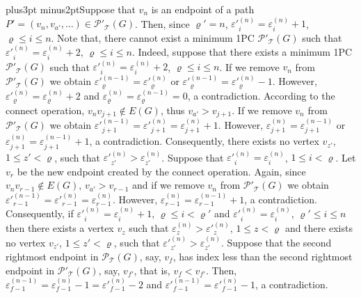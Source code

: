 \documentclass[10pt]{article}
\def\yskip{\penalty-50\vskip3pt plus3pt minus2pt}
\def\y{\yskip}
\begin{document}
{\y Suppose that $v_n$ is an endpoint of a path $P'=(v_n, v_{a'},
\ldots) \in \mathcal{P'_{\mathcal{T}}}(G)$. Then, since
$\varrho'=n$, $\varepsilon'^{(n)}_i = \varepsilon^{(n)}_i +1$,
$\varrho \leq i \leq n$. Note that, there cannot exist a minimum
1PC $\mathcal{P'_{\mathcal{T}}}(G)$ such that
$\varepsilon'^{(n)}_i = \varepsilon^{(n)}_i +2$, $\varrho \leq i
\leq n$. Indeed, suppose that there exists a minimum 1PC
$\mathcal{P'_{\mathcal{T}}}(G)$ such that $\varepsilon'^{(n)}_i =
\varepsilon^{(n)}_i +2$, $\varrho \leq i \leq n$. If we remove
$v_n$ from $\mathcal{P'_{\mathcal{T}}}(G)$ we obtain
$\varepsilon'^{(n-1)}_\varrho=\varepsilon'^{(n)}_\varrho$ or
$\varepsilon'^{(n-1)}_\varrho=\varepsilon'^{(n)}_\varrho-1$.
However, $\varepsilon'^{(n)}_\varrho=\varepsilon^{(n)}_\varrho+2$
and $\varepsilon^{(n)}_\varrho=\varepsilon^{(n-1)}_\varrho=0$, a
contradiction. According to the connect operation, $v_nv_{j+1}
\notin E(G)$, thus $v_{a'}>v_{j+1}$. If we remove $v_n$ from
$\mathcal{P'_{\mathcal{T}}}(G)$ we obtain
$\varepsilon'^{(n-1)}_{j+1}=\varepsilon'^{(n)}_{j+1}=\varepsilon^{(n)}_{j+1}+1$.
However, $\varepsilon^{(n)}_{j+1}=\varepsilon^{(n-1)}_{j+1}$ or
$\varepsilon^{(n)}_{j+1}=\varepsilon^{(n-1)}_{j+1}+1$, a
contradiction. Consequently, there exists no vertex $v_{z'}$, $1
\leq z' <\varrho$, such that
$\varepsilon'^{(n)}_{z'}>\varepsilon^{(n)}_{z'}$. Suppose that
$\varepsilon'^{(n)}_i=\varepsilon^{(n)}_i$, $1 \leq i <\varrho$.
Let $v_r$ be the new endpoint created by the connect operation.
Again, since $v_nv_{r-1} \notin E(G)$, $v_{a'}>v_{r-1}$ and if we
remove $v_n$ from $\mathcal{P'_{\mathcal{T}}}(G)$ we obtain
$\varepsilon'^{(n-1)}_{r-1}=\varepsilon'^{(n)}_{r-1}=\varepsilon^{(n)}_{r-1}$.
However, $\varepsilon^{(n)}_{r-1}=\varepsilon^{(n-1)}_{r-1}+1$, a
contradiction. Consequently, if $\varepsilon'^{(n)}_i =
\varepsilon^{(n)}_i +1$, $\varrho \leq i < \varrho'$ and
$\varepsilon'^{(n)}_i = \varepsilon^{(n)}_i$, $\varrho' \leq i
\leq n$ then there exists a vertex $v_z$ such that
$\varepsilon^{(n)}_z > \varepsilon'^{(n)}_z$, $1 \leq z < \varrho$
and there exists no vertex $v_{z'}$, $1 \leq z' <\varrho$, such
that $\varepsilon'^{(n)}_{z'}>\varepsilon^{(n)}_{z'}$. Suppose
that the second rightmost endpoint in
$\mathcal{P_{\mathcal{T}}}(G)$, say, $v_f$, has index less than
the second rightmost endpoint in $\mathcal{P'_{\mathcal{T}}}(G)$,
say, $v_{f'}$, that is, $v_f<v_{f'}$. Then,
$\varepsilon^{(n-1)}_{f-1}=\varepsilon^{(n)}_{f-1}-1=\varepsilon'^{(n)}_{f-1}-2$
and $\varepsilon'^{(n-1)}_{f-1}=\varepsilon'^{(n)}_{f-1}-1$, a
contradiction.

}
\end{document}
